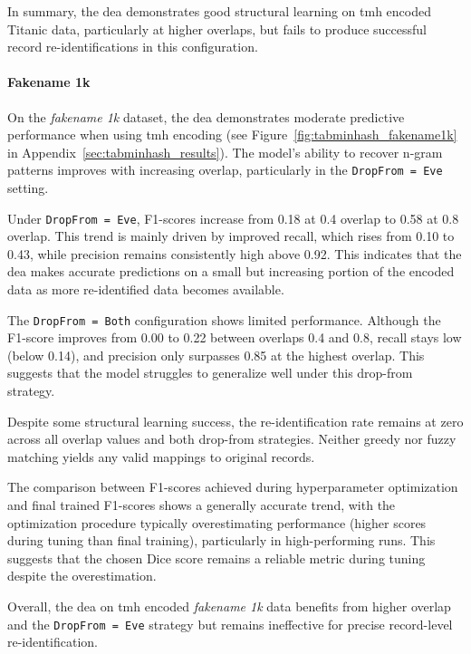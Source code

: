 In summary, the \ac{dea} demonstrates good structural learning on \ac{tmh} encoded Titanic data, particularly at higher overlaps, but fails to produce successful record re-identifications in this configuration.


\paragraph{Fakename 1k}

On the \textit{fakename 1k} dataset, the \ac{dea} demonstrates moderate predictive performance when using \ac{tmh} encoding (see Figure~\ref{fig:tabminhash_fakename1k} in Appendix~\ref{sec:tabminhash_results}).
The model's ability to recover n-gram patterns improves with increasing overlap, particularly in the \texttt{DropFrom = Eve} setting.

Under \texttt{DropFrom = Eve}, F1-scores increase from 0.18 at 0.4 overlap to 0.58 at 0.8 overlap.
This trend is mainly driven by improved recall, which rises from 0.10 to 0.43, while precision remains consistently high above 0.92.
This indicates that the \ac{dea} makes accurate predictions on a small but increasing portion of the encoded data as more re-identified data becomes available.

The \texttt{DropFrom = Both} configuration shows limited performance.
Although the F1-score improves from 0.00 to 0.22 between overlaps 0.4 and 0.8, recall stays low (below 0.14), and precision only surpasses 0.85 at the highest overlap.
This suggests that the model struggles to generalize well under this drop-from strategy.

Despite some structural learning success, the re-identification rate remains at zero across all overlap values and both drop-from strategies.
Neither greedy nor fuzzy matching yields any valid mappings to original records.

The comparison between F1-scores achieved during hyperparameter optimization and final trained F1-scores shows a generally accurate trend, with the optimization procedure typically overestimating performance (higher scores during tuning than final training), particularly in high-performing runs.
This suggests that the chosen Dice score remains a reliable metric during tuning despite the overestimation.

Overall, the \ac{dea} on \ac{tmh} encoded \textit{fakename 1k} data benefits from higher overlap and the \texttt{DropFrom = Eve} strategy but remains ineffective for precise record-level re-identification.



